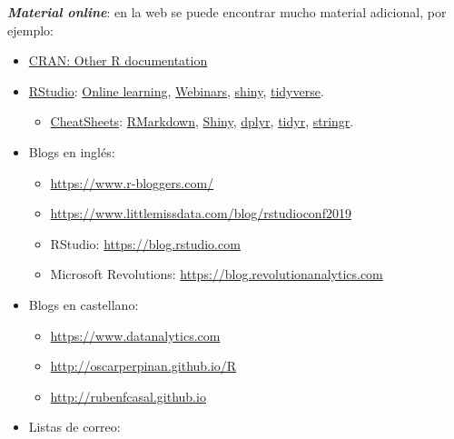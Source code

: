 \documentclass[]{book}
\providecommand{\tightlist}{%
  \setlength{\itemsep}{0pt}\setlength{\parskip}{0pt}}
\theoremstyle{definition}
\theoremstyle{definition}
\theoremstyle{definition}
\theoremstyle{remark}
\begin{document}
\textbf{\emph{Material online}}: en la web se puede encontrar mucho
material adicional, por ejemplo:

\begin{itemize}
\item
  \href{https://www.r-project.org/other-docs.html}{CRAN: Other R
  documentation}
\item
  \href{https://www.rstudio.com}{RStudio}:
  \href{https://www.rstudio.com/online-learning}{Online learning},
  \href{https://resources.rstudio.com/webinars}{Webinars},
  \href{http://shiny.rstudio.com}{shiny},
  \href{https://www.tidyverse.org/}{tidyverse}.

  \begin{itemize}
  \tightlist
  \item
    \href{https://resources.rstudio.com/rstudio-cheatsheets}{CheatSheets}:
    \href{https://resources.rstudio.com/rstudio-cheatsheets/rmarkdown-2-0-cheat-sheet}{RMarkdown},
    \href{https://resources.rstudio.com/rstudio-cheatsheets/shiny-cheat-sheet}{Shiny},
    \href{https://github.com/rstudio/cheatsheets/blob/master/data-transformation.pdf}{dplyr},
    \href{https://github.com/rstudio/cheatsheets/blob/master/data-import.pdf}{tidyr},
    \href{https://resources.rstudio.com/rstudio-cheatsheets/stringr-cheat-sheet}{stringr}.
  \end{itemize}
\item
  Blogs en inglés:

  \begin{itemize}
  \item
    \url{https://www.r-bloggers.com/}
  \item
    \url{https://www.littlemissdata.com/blog/rstudioconf2019}
  \item
    RStudio: \url{https://blog.rstudio.com}
  \item
    Microsoft Revolutions: \url{https://blog.revolutionanalytics.com}
  \end{itemize}
\item
  Blogs en castellano:

  \begin{itemize}
  \item
    \url{https://www.datanalytics.com}
  \item
    \url{http://oscarperpinan.github.io/R}
  \item
    \url{http://rubenfcasal.github.io}
  \end{itemize}
\item
  Listas de correo:


\end{itemize}
\end{document}
